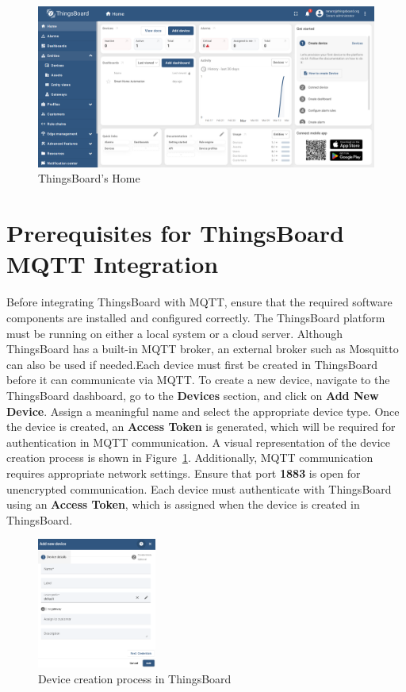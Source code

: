 \documentclass[a4paper,12pt]{report}
\begin{document}
 \begin{figure}[H]
    \centering
    \includegraphics[width=1\textwidth]{home.PNG}
    \caption{ThingsBoard's Home}
 \end{figure}

 \section{Prerequisites for ThingsBoard MQTT Integration}

 Before integrating ThingsBoard with MQTT, ensure that the required software components are installed and configured correctly. The ThingsBoard platform must be running on either a local system or a cloud server. Although ThingsBoard has a built-in MQTT broker, an external broker such as Mosquitto can also be used if needed.Each device must first be created in ThingsBoard before it can communicate via MQTT. To create a new device, navigate to the ThingsBoard dashboard, go to the \textbf{Devices} section, and click on \textbf{Add New Device}. Assign a meaningful name and select the appropriate device type. Once the device is created, an \textbf{Access Token} is generated, which will be required for authentication in MQTT communication. A visual representation of the device creation process is shown in Figure~\ref{fig:device_creation}. Additionally, MQTT communication requires appropriate network settings. Ensure that port \textbf{1883} is open for unencrypted communication. Each device must authenticate with ThingsBoard using an \textbf{Access Token}, which is assigned when the device is created in ThingsBoard.
 
 \begin{figure}[H]
    \centering
    \includegraphics[width=0.35\textwidth]{device creation.PNG}
    \caption{Device creation process in ThingsBoard}
    \label{fig:device_creation}
 \end{figure}
\end{document}
